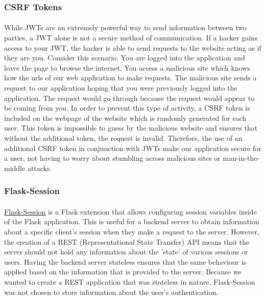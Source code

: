 \documentclass[12pt]{article}
\begin{document}
	\subsubsection{CSRF Tokens}
	\paragraph{}
		While JWTs are an extremely powerful way to send information between two parties, a JWT alone is not a secure method of communication. If a hacker gains access to your JWT, the hacker is able to send requests to the website acting as if they are you. Consider this scenario: You are logged into the application and leave the page to browse the internet. You access a malicious site which knows how the urls of our web application to make requests. The malicious site sends a request to our application hoping that you were previously logged into the application. The request would go through because the request would appear to be coming from you. In order to prevent this type of activity, a CSRF token is included on the webpage of the website which is randomly generated for each user. This token is impossible to guess by the malicious website and ensures that without the additional token, the request is invalid. Therefore, the use of an additional CSRF token in conjunction with JWTs make our application secure for a user, not having to worry about stumbling across malicious sites or man-in-the-middle attacks.

	\subsubsection{Flask-Session}	
	\paragraph{}
		\href{https://pythonhosted.org/Flask-Session/}{Flask-Session} is a Flask extension that allows configuring session variables inside of the Flask application. This is useful for a backend server to obtain information about a specific client's session when they make a request to the server. However, the creation of a REST (Representational State Transfer) API means that the server should not hold any information about the 'state' of various sessions or users. Having the backend server stateless ensures that the same behaviour is applied based on the information that is provided to the server. Because we wanted to create a REST application that was stateless in nature, Flask-Session was not chosen to store information about the user's authentication.
		
\end{document}

